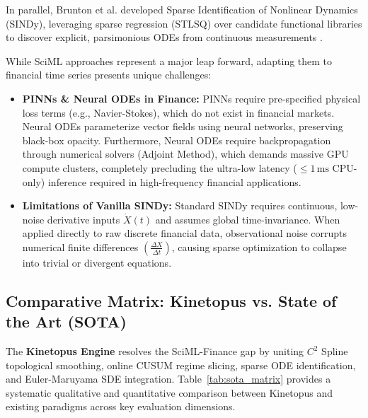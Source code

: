 \documentclass[11pt,a4paper]{article}
\begin{document}
In parallel, Brunton et al. \cite{brunton2016discovering} developed Sparse Identification of Nonlinear Dynamics (SINDy), leveraging sparse regression (STLSQ) over candidate functional libraries to discover explicit, parsimonious ODEs from continuous measurements \cite{champion2019data}.

While SciML approaches represent a major leap forward, adapting them to financial time series presents unique challenges:
\begin{itemize}[leftmargin=1.5em]
    \item \textbf{PINNs \& Neural ODEs in Finance:} PINNs require pre-specified physical loss terms (e.g., Navier-Stokes), which do not exist in financial markets. Neural ODEs parameterize vector fields using neural networks, preserving black-box opacity. Furthermore, Neural ODEs require backpropagation through numerical solvers (Adjoint Method), which demands massive GPU compute clusters, completely precluding the ultra-low latency ($\le 1\,\text{ms}$ CPU-only) inference required in high-frequency financial applications.
    \item \textbf{Limitations of Vanilla SINDy:} Standard SINDy requires continuous, low-noise derivative inputs $\dot{X}(t)$ and assumes global time-invariance. When applied directly to raw discrete financial data, observational noise corrupts numerical finite differences $(\frac{\Delta X}{\Delta t})$, causing sparse optimization to collapse into trivial or divergent equations.
\end{itemize}

\subsection{Comparative Matrix: Kinetopus vs. State of the Art (SOTA)}

The \textbf{Kinetopus Engine} resolves the SciML-Finance gap by uniting $C^2$ Spline topological smoothing, online CUSUM regime slicing, sparse ODE identification, and Euler-Maruyama SDE integration. Table~\ref{tab:sota_matrix} provides a systematic qualitative and quantitative comparison between Kinetopus and existing paradigms across key evaluation dimensions.
\end{document}
